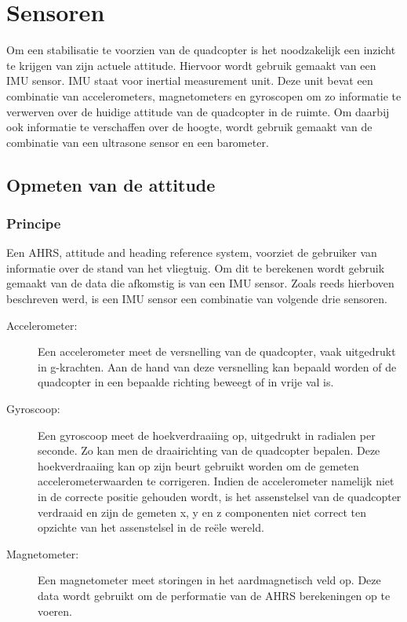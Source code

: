 	\section{Sensoren}

		\par Om een stabilisatie te voorzien van de quadcopter is het noodzakelijk een inzicht te krijgen van zijn actuele attitude. Hiervoor wordt gebruik gemaakt van een IMU sensor. IMU staat voor inertial measurement unit. Deze unit bevat een combinatie van accelerometers, magnetometers en gyroscopen om zo informatie te verwerven over de huidige attitude van de quadcopter in de ruimte. Om daarbij ook informatie te verschaffen over de hoogte, wordt gebruik gemaakt van de combinatie van een ultrasone sensor en een barometer.

		\subsection{Opmeten van de attitude}

			\subsubsection{Principe}

			\par Een AHRS, attitude and heading reference system, voorziet de gebruiker van informatie over de stand van het vliegtuig. Om dit te berekenen wordt gebruik gemaakt van de data die afkomstig is van een IMU sensor. Zoals reeds hierboven beschreven werd, is een IMU sensor een combinatie van volgende drie sensoren.

				\begin{description}
				
					\item[Accelerometer:] Een accelerometer meet de versnelling van de quadcopter, vaak uitgedrukt in g-krachten. Aan de hand van deze versnelling kan bepaald worden of de quadcopter in een bepaalde richting beweegt of in vrije val is.
				
					\item[Gyroscoop:] Een gyroscoop meet de hoekverdraaiing op, uitgedrukt in radialen per seconde. Zo kan men de draairichting van de quadcopter bepalen. Deze hoekverdraaiing kan op zijn beurt gebruikt worden om de gemeten accelerometerwaarden te corrigeren. Indien de accelerometer namelijk niet in de correcte positie gehouden wordt, is het assenstelsel van de quadcopter verdraaid en zijn de gemeten x, y en z componenten niet correct ten opzichte van het assenstelsel in de re\"ele wereld.

					\item[Magnetometer:] Een magnetometer meet storingen in het aardmagnetisch veld op. Deze data wordt gebruikt om de performatie van de AHRS berekeningen op te voeren.
				
				\end{description}


